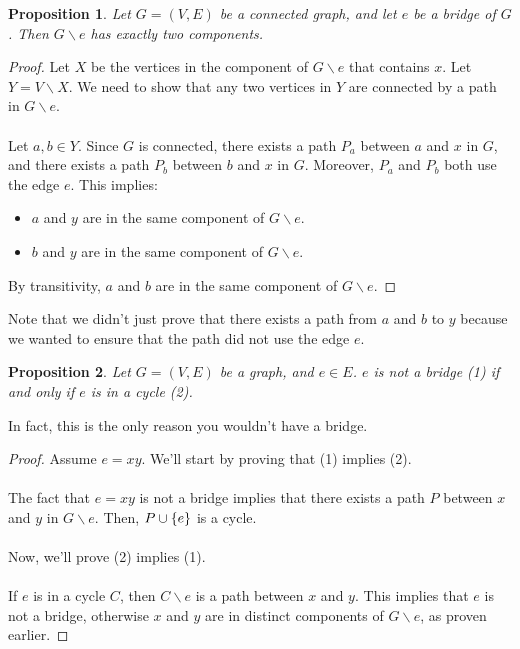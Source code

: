 \documentclass[]{article}
\newtheorem*{proposition}{Proposition}
\theoremstyle{definition}
\DeclarePairedDelimiter{\set}{\lbrace}{\rbrace}
\begin{document}
				\begin{proposition}
					Let $G = (V, E)$ be a connected graph, and let $e$ be a bridge of $G$. Then $G \backslash e$ has exactly two components.
				\end{proposition}

				\begin{proof}
					Let $X$ be the vertices in the component of $G \backslash e$ that contains $x$. Let $Y = V \backslash X$. We need to show that any two vertices in $Y$ are connected by a path in $G \backslash e$.
					\\ \\
					Let $a, b \in Y$. Since $G$ is connected, there exists a path $P_a$ between $a$ and $x$ in $G$, and there exists a path $P_b$ between $b$ and $x$ in $G$. Moreover, $P_a$ and $P_b$ both use the edge $e$. This implies:
					\begin{itemize}
						\item $a$ and $y$ are in the same component of $G \backslash e$.
						\item $b$ and $y$ are in the same component of $G \backslash e$.
					\end{itemize}

					By transitivity, $a$ and $b$ are in the same component of $G \backslash e$.
				\end{proof}

				Note that we didn't just prove that there exists a path from $a$ and $b$ to $y$ because we wanted to ensure that the path did not use the edge $e$.

				\begin{proposition}
					Let $G = (V, E)$ be a graph, and $e \in E$. $e$ is \emph{not} a bridge (1) if and only if $e$ is in a cycle (2).
				\end{proposition}

				In fact, this is the only reason you wouldn't have a bridge.

				\begin{proof}
					Assume $e = xy$. We'll start by proving that (1) implies (2).
					\\ \\
					The fact that $e = xy$ is not a bridge implies that there exists a path $P$ between $x$ and $y$ in $G \backslash e$. Then, $P \cup \set{e}$ is a cycle.
					\\ \\
					Now, we'll prove (2) implies (1).
					\\ \\
					If $e$ is in a cycle $C$, then $C \backslash e$ is a path between $x$ and $y$. This implies that $e$ is not a bridge, otherwise $x$ and $y$ are in distinct components of $G \backslash e$, as proven earlier.
				\end{proof}
\end{document}

